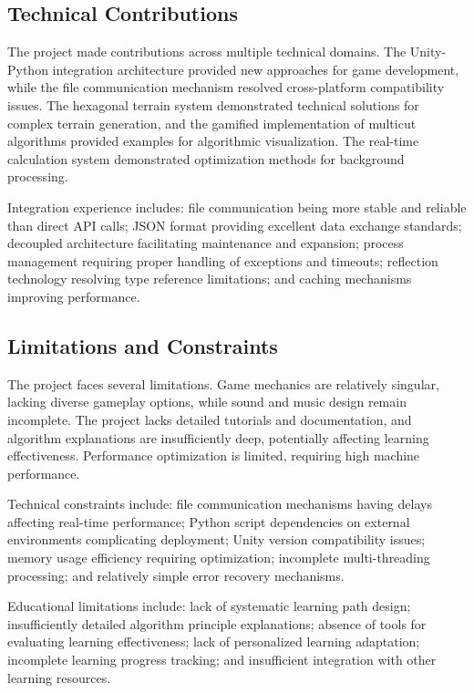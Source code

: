 \documentclass[english]{tudscrreprt}
\begin{document}
\subsection{Technical Contributions}
The project made contributions across multiple technical domains. The Unity-Python integration architecture provided new approaches for game development, while the file communication mechanism resolved cross-platform compatibility issues. The hexagonal terrain system demonstrated technical solutions for complex terrain generation, and the gamified implementation of multicut algorithms provided examples for algorithmic visualization. The real-time calculation system demonstrated optimization methods for background processing.

Integration experience includes: file communication being more stable and reliable than direct API calls; JSON format providing excellent data exchange standards; decoupled architecture facilitating maintenance and expansion; process management requiring proper handling of exceptions and timeouts; reflection technology resolving type reference limitations; and caching mechanisms improving performance.

\subsection{Limitations and Constraints}
The project faces several limitations. Game mechanics are relatively singular, lacking diverse gameplay options, while sound and music design remain incomplete. The project lacks detailed tutorials and documentation, and algorithm explanations are insufficiently deep, potentially affecting learning effectiveness. Performance optimization is limited, requiring high machine performance.

Technical constraints include: file communication mechanisms having delays affecting real-time performance; Python script dependencies on external environments complicating deployment; Unity version compatibility issues; memory usage efficiency requiring optimization; incomplete multi-threading processing; and relatively simple error recovery mechanisms.

Educational limitations include: lack of systematic learning path design; insufficiently detailed algorithm principle explanations; absence of tools for evaluating learning effectiveness; lack of personalized learning adaptation; incomplete learning progress tracking; and insufficient integration with other learning resources.
\end{document}
